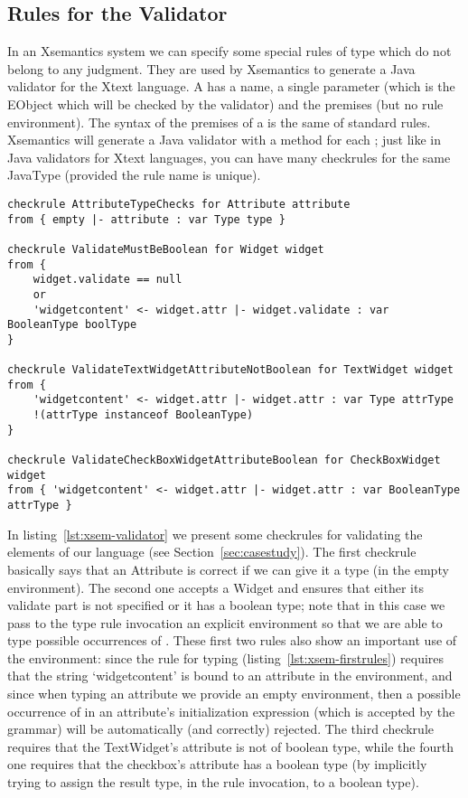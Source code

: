 \subsection{Rules for the Validator}
\label{sec:xsem-validation}

In an Xsemantics system we can specify some special rules of type
 which do not belong to any judgment. They are used by
Xsemantics to generate a Java validator for the Xtext language.  A
 has a name, a single parameter (which is the EObject which will
be checked by the validator) and the premises (but no rule environment).  The
syntax of the premises of a  is the same of standard rules.
Xsemantics will generate a Java validator with a \checkm{} method for each
; just like in Java validators for Xtext languages, you can have
many checkrules for the same JavaType (provided the rule name is unique).

\begin{lstlisting}[language=xsemantics,float,label=lst:xsem-validator,caption=Some
checkrules for the Validator.] 
checkrule AttributeTypeChecks for Attribute attribute
from { empty |- attribute : var Type type }

checkrule ValidateMustBeBoolean for Widget widget
from {
	widget.validate == null
	or 
	'widgetcontent' <- widget.attr |- widget.validate : var BooleanType boolType
}

checkrule ValidateTextWidgetAttributeNotBoolean for TextWidget widget
from {
	'widgetcontent' <- widget.attr |- widget.attr : var Type attrType
	!(attrType instanceof BooleanType)
}

checkrule ValidateCheckBoxWidgetAttributeBoolean for CheckBoxWidget widget
from { 'widgetcontent' <- widget.attr |- widget.attr : var BooleanType attrType }
\end{lstlisting}

In listing~\ref{lst:xsem-validator} we present some checkrules for validating
the elements of our language (see Section~\ref{sec:casestudy}).  The first
checkrule basically says that an Attribute is correct if we can give it a type
(in the empty environment).  The second one accepts a Widget and ensures that
either its validate part is not specified or it has a boolean type; note that in
this case we pass to the type rule invocation an explicit environment so that we
are able to type possible occurrences of .  These first
two rules also show an important use of the environment: since the rule for
typing  (listing~\ref{lst:xsem-firstrules}) requires that
the string `widgetcontent' is bound to an attribute in the environment, and
since when typing an attribute we provide an empty environment, then a possible
occurrence of  in an attribute's initialization expression
(which is accepted by the grammar) will be automatically (and correctly)
rejected.
The third checkrule requires that the TextWidget's attribute is not of boolean
type, while the fourth one requires that the checkbox's attribute has a boolean
type (by implicitly trying to assign the result type, in the rule invocation, to
a boolean type).
